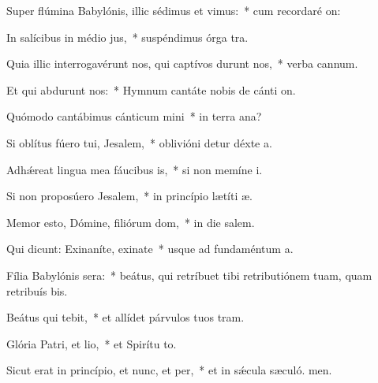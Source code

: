 \item Super flúmina Babylónis, illic sédimus et vimus:~* cum recordaré on:
\item In salícibus in médio jus,~* suspéndimus órga tra.
\item Quia illic interrogavérunt nos, qui captívos durunt nos,~* verba cannum.
\item Et qui abdurunt nos:~* Hymnum cantáte nobis de cánti on.
\item Quómodo cantábimus cánticum mini~* in terra ana?
\item Si oblítus fúero tui, Jesalem,~* oblivióni detur déxte a.
\item Adhǽreat lingua mea fáucibus is,~* si non memíne i.
\item Si non proposúero Jesalem,~* in princípio lætíti æ.
\item Memor esto, Dómine, filiórum dom,~* in die salem.
\item Qui dicunt: Exinaníte, exinate~* usque ad fundaméntum  a.
\item Fília Babylónis sera:~* beátus, qui retríbuet tibi retributiónem tuam, quam retribuís bis.
\item Beátus qui tebit,~* et allídet párvulos tuos  tram.
\item Glória Patri, et lio,~* et Spirítu to.
\item Sicut erat in princípio, et nunc, et per,~* et in sǽcula sæculó. men.
